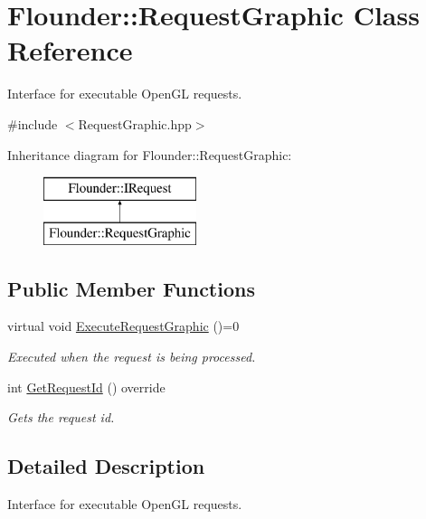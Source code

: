 \hypertarget{class_flounder_1_1_request_graphic}{}\section{Flounder\+:\+:Request\+Graphic Class Reference}
\label{class_flounder_1_1_request_graphic}


Interface for executable Open\+GL requests.  




{\ttfamily \#include $<$Request\+Graphic.\+hpp$>$}

Inheritance diagram for Flounder\+:\+:Request\+Graphic\+:\begin{figure}[H]
\begin{center}
\leavevmode
\includegraphics[height=2.000000cm]{class_flounder_1_1_request_graphic}
\end{center}
\end{figure}
\subsection*{Public Member Functions}
\begin{DoxyCompactItemize}
\item 
virtual void \hyperlink{class_flounder_1_1_request_graphic_a04554e0bf9b1feb987240e00bdf7f169}{Execute\+Request\+Graphic} ()=0
\begin{DoxyCompactList}\small\item\em Executed when the request is being processed. \end{DoxyCompactList}\item 
int \hyperlink{class_flounder_1_1_request_graphic_a4480f0a81c8f8623619195cc6d87ef20}{Get\+Request\+Id} () override
\begin{DoxyCompactList}\small\item\em Gets the request id. \end{DoxyCompactList}\end{DoxyCompactItemize}


\subsection{Detailed Description}
Interface for executable Open\+GL requests. 



